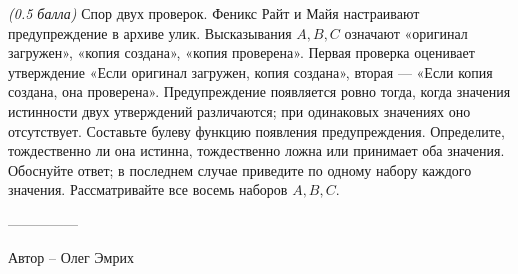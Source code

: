 \question
\textit{(0.5 балла)} Спор двух проверок. Феникс Райт и Майя настраивают предупреждение в архиве улик. Высказывания $A,B,C$ означают «оригинал загружен», «копия создана», «копия проверена». Первая проверка оценивает утверждение «Если оригинал загружен, копия создана», вторая --- «Если копия создана, она проверена». Предупреждение появляется ровно тогда, когда значения истинности двух утверждений различаются; при одинаковых значениях оно отсутствует.
Составьте булеву функцию появления предупреждения. Определите, тождественно ли она истинна, тождественно ложна или принимает оба значения. Обоснуйте ответ; в последнем случае приведите по одному набору каждого значения. Рассматривайте все восемь наборов $A,B,C$.

---------------

Автор -- Олег Эмрих
